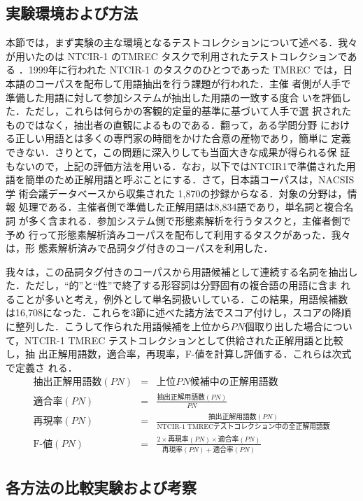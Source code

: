 \subsection{実験環境および方法}
本節では，まず実験の主な環境となるテストコレクションについて述べる．我々
が用いたのは NTCIR-1 のTMREC タスクで利用されたテストコレクションである
\cite{kageura99}．1999年に行われた NTCIR-1 のタスクのひとつであった 
TMREC では，日本語のコーパスを配布して用語抽出を行う課題が行われた．主催
者側が人手で準備した用語に対して参加システムが抽出した用語の一致する度合
いを評価した．ただし，これらは何らかの客観的定量的基準に基づいて人手で選
択されたものではなく，抽出者の直観によるものである．翻って，ある学問分野
における正しい用語とは多くの専門家の時間をかけた合意の産物であり，簡単に
定義できない．さりとて，この問題に深入りしても当面大きな成果が得られる保
証もないので，上記の評価方法を用いる．なお，以下ではNTCIR1で準備された用
語を簡単のため正解用語と呼ぶことにする．さて，日本語コーパスは，NACSIS学
術会議データベースから収集された 1,870の抄録からなる．対象の分野は，情報
処理である．主催者側で準備した正解用語は8,834語であり，単名詞と複合名詞
が多く含まれる．参加システム側で形態素解析を行うタスクと，主催者側で予め
行って形態素解析済みコーパスを配布して利用するタスクがあった．我々は，形
態素解析済みで品詞タグ付きのコーパスを利用した．

我々は，この品詞タグ付きのコーパスから用語候補として連続する名詞を抽出し
た．ただし，``的''と``性''で終了する形容詞は分野固有の複合語の用語に含ま
れることが多いと考え，例外として単名詞扱いしている．この結果，用語候補数
は16,708になった．これらを3節に述べた諸方法でスコア付けし，スコアの降順
に整列した．こうして作られた用語候補を上位から$PN$個取り出した場合につい
て，NTCIR-1 TMREC テストコレクションとして供給された正解用語と比較し，抽
出正解用語数，適合率，再現率，F-値を計算し評価する．これらは次式で定義さ
れる．
\begin{eqnarray}
抽出正解用語数(PN) &=& 上位PN候補中の正解用語数\\
適合率(PN) &=& \frac{抽出正解用語数(PN)}{PN}\\
再現率(PN) &=& \frac{抽出正解用語数(PN)}{\mbox{NTCIR-1 TMREC}テストコレクション中の全正解用語数}\\
\mbox{F-値}(PN)&=&\frac{2 \times 再現率(PN) \times 適合率(PN)}{ 再現率(PN) + 適合率(PN)}
\end{eqnarray}

\subsection{各方法の比較実験および考察}

